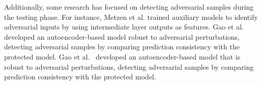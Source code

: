 Additionally, some research has focused on detecting adversarial samples during the testing phase. For instance, Metzen et al.\cite{metzen2017detecting} trained auxiliary models to identify adversarial inputs by using intermediate layer outputs as features. Gao et al.\cite{gao2023detecting} developed an autoencoder-based model robust to adversarial perturbations, detecting adversarial samples by comparing prediction consistency with the protected model.
Gao et al.~\cite{gao2023detecting} developed an autoencoder-based model that is robust to adversarial perturbations, detecting adversarial samples by comparing prediction consistency with the protected model.


